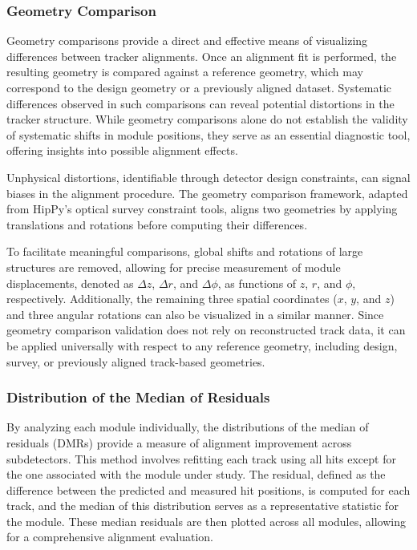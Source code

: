 \subsubsection{Geometry Comparison}

Geometry comparisons provide a direct and effective means of visualizing differences between tracker alignments. Once an alignment fit is performed, the resulting geometry is compared against a reference geometry, which may correspond to the design geometry or a previously aligned dataset. Systematic differences observed in such comparisons can reveal potential distortions in the tracker structure. While geometry comparisons alone do not establish the validity of systematic shifts in module positions, they serve as an essential diagnostic tool, offering insights into possible alignment effects.

Unphysical distortions, identifiable through detector design constraints, can signal biases in the alignment procedure. The geometry comparison framework, adapted from HipPy’s optical survey constraint tools, aligns two geometries by applying translations and rotations before computing their differences. 

To facilitate meaningful comparisons, global shifts and rotations of large structures are removed, allowing for precise measurement of module displacements, denoted as \( \Delta z \), \( \Delta r \), and \( \Delta \phi \), as functions of \( z \), \( r \), and \( \phi \), respectively. Additionally, the remaining three spatial coordinates (\( x \), \( y \), and \( z \)) and three angular rotations can also be visualized in a similar manner. Since geometry comparison validation does not rely on reconstructed track data, it can be applied universally with respect to any reference geometry, including design, survey, or previously aligned track-based geometries.

\subsubsection{Distribution of the Median of Residuals}

By analyzing each module individually, the distributions of the median of residuals (DMRs) provide a measure of alignment improvement across subdetectors. This method involves refitting each track using all hits except for the one associated with the module under study. The residual, defined as the difference between the predicted and measured hit positions, is computed for each track, and the median of this distribution serves as a representative statistic for the module. These median residuals are then plotted across all modules, allowing for a comprehensive alignment evaluation.

